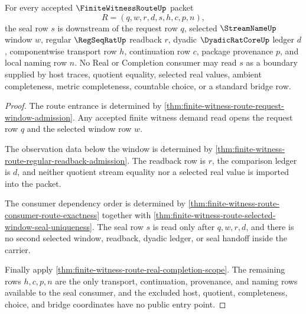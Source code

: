 \begin{theorem}
\label{thm:finite-witness-route-seal-boundary-scope}
For every accepted $\FiniteWitnessRouteUp$ packet
$$
R=(q,w,r,d,s,h,c,p,n),
$$
the seal row $s$ is downstream of the request row $q$, selected $\StreamNameUp$ window $w$, regular $\RegSeqRatUp$ readback $r$, dyadic $\DyadicRatCoreUp$ ledger $d$, componentwise transport row $h$, continuation row $c$, package provenance $p$, and local naming row $n$. No Real or Completion consumer may read $s$ as a boundary supplied by host traces, quotient equality, selected real values, ambient completeness, metric completeness, countable choice, or a standard bridge row.
\end{theorem}
\begin{proof}
The route entrance is determined by \autoref{thm:finite-witness-route-request-window-admission}. Any accepted finite witness demand read opens the request row $q$ and the selected window row $w$.

The observation data below the window is determined by \autoref{thm:finite-witness-route-regular-readback-admission}. The readback row is $r$, the comparison ledger is $d$, and neither quotient stream equality nor a selected real value is imported into the packet.

The consumer dependency order is determined by \autoref{thm:finite-witness-route-consumer-route-exactness} together with \autoref{thm:finite-witness-route-selected-window-seal-uniqueness}. The seal row $s$ is read only after $q,w,r,d$, and there is no second selected window, readback, dyadic ledger, or seal handoff inside the carrier.

Finally apply \autoref{thm:finite-witness-route-real-completion-scope}. The remaining rows $h,c,p,n$ are the only transport, continuation, provenance, and naming rows available to the seal consumer, and the excluded host, quotient, completeness, choice, and bridge coordinates have no public entry point.
\end{proof}

